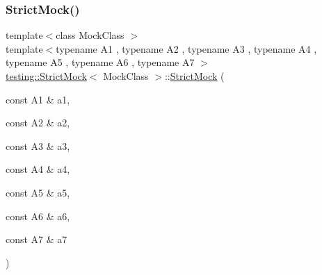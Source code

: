 \mbox{\label{classtesting_1_1_strict_mock_a4af48752fc22815250369292b9c064bc}} 
\subsubsection{\texorpdfstring{Strict\+Mock()}{StrictMock()}\hspace{0.1cm}{\footnotesize\ttfamily [8/11]}}
{\footnotesize\ttfamily template$<$class Mock\+Class $>$ \\
template$<$typename A1 , typename A2 , typename A3 , typename A4 , typename A5 , typename A6 , typename A7 $>$ \\
\hyperlink{classtesting_1_1_strict_mock}{testing\+::\+Strict\+Mock}$<$ Mock\+Class $>$\+::\hyperlink{classtesting_1_1_strict_mock}{Strict\+Mock} (\begin{DoxyParamCaption}\item[{const A1 \&}]{a1,  }\item[{const A2 \&}]{a2,  }\item[{const A3 \&}]{a3,  }\item[{const A4 \&}]{a4,  }\item[{const A5 \&}]{a5,  }\item[{const A6 \&}]{a6,  }\item[{const A7 \&}]{a7 }\end{DoxyParamCaption})\hspace{0.3cm}{\ttfamily [inline]}}

\mbox{\label{classtesting_1_1_strict_mock_aac6eaaad3e94491ada7bb43ee6149775}} 
